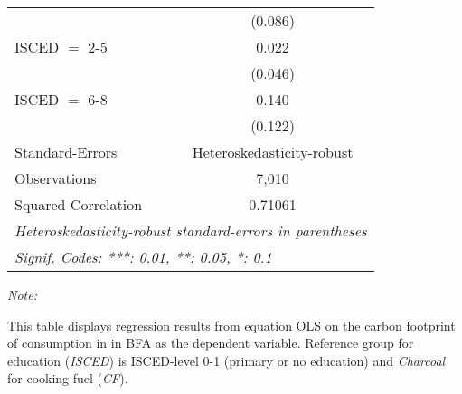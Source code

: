\begin{table}[htbp!]
\begin{adjustbox}{width = 1\textwidth, max height = 0.95\textheight, center}
\begin{threeparttable}[b]
\begin{tabular}{lc}
                                & (0.086)\\   
            ISCED $=$ 2-5       & 0.022\\   
                                & (0.046)\\   
            ISCED $=$ 6-8       & 0.140\\   
                                & (0.122)\\   
            \midrule 
            Standard-Errors     & Heteroskedasticity-robust \\   
            Observations        & 7,010\\  
            Squared Correlation & 0.71061\\  
            \midrule \midrule
            \multicolumn{2}{l}{\emph{Heteroskedasticity-robust standard-errors in parentheses}}\\
            \multicolumn{2}{l}{\emph{Signif. Codes: ***: 0.01, **: 0.05, *: 0.1}}\\
         \end{tabular}
         
         \begin{tablenotes}\item \medskip \textit{Note:}
            \item This table displays regression results from equation OLS on the carbon footprint of consumption in  in BFA as the dependent variable.  Reference group for education (\textit{ISCED}) is ISCED-level 0-1 (primary or no education) and \textit{Charcoal} for cooking fuel (\textit{CF}).
         \end{tablenotes}
      \end{threeparttable}
   \end{adjustbox}
\end{table}


